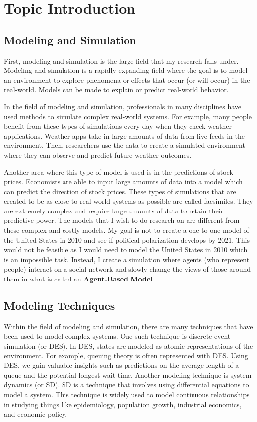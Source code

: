 \section{Topic Introduction}

\subsection{Modeling and Simulation}
First, modeling and simulation is the large field that my research falls under. Modeling and simulation is a rapidly expanding field where the goal is to model an environment to explore phenomena or effects that occur (or will occur) in the real-world. Models can be made to explain or predict real-world behavior. 

In the field of modeling and simulation, professionals in many disciplines have used methods to simulate complex real-world systems. For example, many people benefit from these types of simulations every day when they check weather applications. Weather apps take in large amounts of data from live feeds in the environment. Then, researchers use the data to create a simulated environment where they can observe and predict future weather outcomes. 


Another area where this type of model is used is in the predictions of stock prices. Economists are able to input large amounts of data into a model which can predict the direction of stock prices. These types of simulations that are created to be as close to real-world systems as possible are called facsimiles. They are extremely complex and require large amounts of data to retain their predictive power. The models that I wish to do research on are different from these complex and costly models. My goal is not to create a one-to-one model of the United States in 2010 and see if political polarization develops by 2021. This would not be feasible as I would need to model the United States in 2010 which is an impossible task. Instead, I create a simulation where agents (who represent people) interact on a social network and slowly change the views of those around them in what is called an \textbf{Agent-Based Model}.  

\subsection{Modeling Techniques}
Within the field of modeling and simulation, there are many techniques that have been used to model complex systems. One such technique is discrete event simulation (or DES). In DES, states are modeled as atomic representations of the environment. For example, queuing theory is often represented with DES. Using DES, we gain valuable insights such as predictions on the average length of a queue and the potential longest wait time. Another modeling technique is system dynamics (or SD). SD is a technique that involves using differential equations to model a system. This technique is widely used to model continuous relationships in studying things like epidemiology, population growth, industrial economics, and economic policy.

